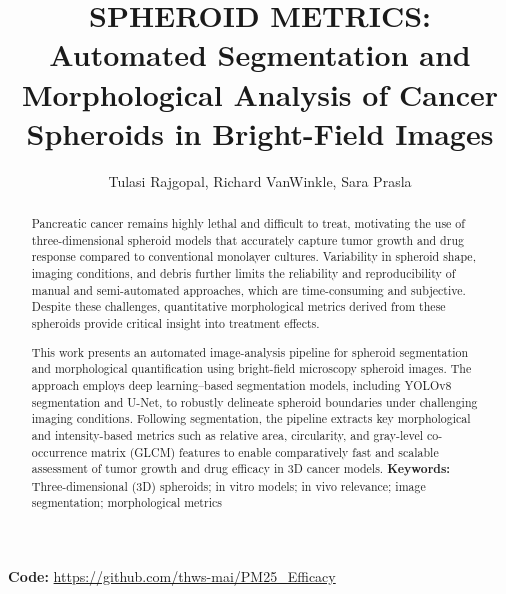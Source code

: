 \documentclass[sigconf, nonacm]{acmart}
\begin{document}
\title{}
\title[SPHEROID METRICS]{SPHEROID METRICS: Automated Segmentation and Morphological Analysis of Cancer Spheroids in Bright-Field Images}

\author{Tulasi Rajgopal, Richard VanWinkle, Sara Prasla}


\renewcommand{\shortauthors}{Rajgopal, VanWinkle, Prasla}

\begin{abstract}
Pancreatic cancer remains highly lethal and difficult to treat, motivating the use of three-dimensional spheroid models that accurately capture tumor growth and drug response compared to conventional monolayer cultures. Variability in spheroid shape, imaging conditions, and debris further limits the reliability and reproducibility of manual and semi-automated approaches, which are time-consuming and subjective. Despite these challenges, quantitative morphological metrics derived from these spheroids provide critical insight into treatment effects.

This work presents an automated image-analysis pipeline for spheroid segmentation and morphological quantification using bright-field microscopy spheroid images. The approach employs deep learning–based segmentation models, including YOLOv8 segmentation and U-Net, to robustly delineate spheroid boundaries under challenging imaging conditions. Following segmentation, the pipeline extracts key morphological and intensity-based metrics such as relative area, circularity, and gray-level co-occurrence matrix (GLCM) features to enable comparatively fast and scalable assessment of tumor growth and drug efficacy in 3D cancer models.
\textbf{Keywords:} Three-dimensional (3D) spheroids; in vitro models; in vivo relevance; image segmentation; morphological metrics

\end{abstract}

\maketitle
\vspace{-0.5em}
\textbf{Code:} \url{https://github.com/thws-mai/PM25_Efficacy}
\end{document}

